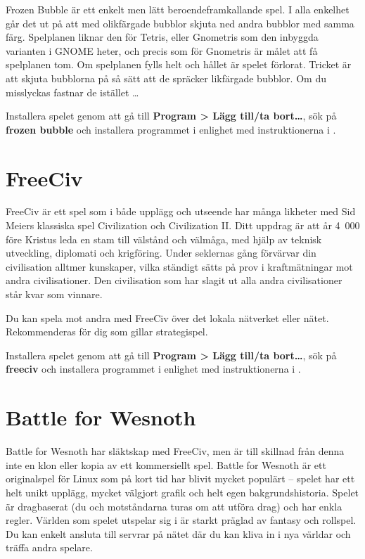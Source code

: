 \documentclass[a4paper,final]{memoir} %
\begin{document}
Frozen Bubble är ett enkelt men lätt beroendeframkallande spel. I alla enkelhet går det ut på att med olikfärgade bubblor skjuta ned andra bubblor med samma färg. Spelplanen liknar den för Tetris, eller Gnometris som den inbyggda varianten i GNOME heter, och precis som för Gnometris är målet att få spelplanen tom. Om spelplanen fylls helt och hållet är spelet förlorat. Tricket är att skjuta bubblorna på så sätt att de spräcker likfärgade bubblor. Om du misslyckas fastnar de istället \ldots{}


Installera spelet genom att gå till \textbf{Program \textgreater{} Lägg till/ta bort\ldots{}}, sök på \textbf{frozen bubble} och installera programmet i enlighet med instruktionerna i .

\section{FreeCiv}

FreeCiv är ett spel som i både upplägg och utseende har många likheter med Sid Meiers klassiska spel Civilization och Civilization II. Ditt uppdrag är att år 4~000 före Kristus leda en stam till välstånd och välmåga, med hjälp av teknisk utveckling, diplomati och krigföring. Under seklernas gång förvärvar din civilisation alltmer kunskaper, vilka ständigt sätts på prov i kraftmätningar mot andra civilisationer. Den civilisation som har slagit ut alla andra civilisationer står kvar som vinnare. 

Du kan spela mot andra med FreeCiv över det lokala nätverket eller nätet. Rekommenderas för dig som gillar strategispel.


Installera spelet genom att gå till \textbf{Program \textgreater{} Lägg till/ta bort\ldots{}}, sök på \textbf{freeciv} och installera programmet i enlighet med instruktionerna i .

\section{Battle for Wesnoth}

Battle for Wesnoth har släktskap med FreeCiv, men är till skillnad från denna inte en klon eller kopia av ett kommersiellt spel. Battle for Wesnoth är ett originalspel för Linux som på kort tid har blivit mycket populärt -- spelet har ett helt unikt upplägg, mycket välgjort grafik och helt egen bakgrundshistoria. Spelet är dragbaserat (du och motståndarna turas om att utföra drag) och har enkla regler. Världen som spelet utspelar sig i är starkt präglad av fantasy och rollspel. Du kan enkelt ansluta till servrar på nätet där du kan kliva in i nya världar och träffa andra spelare.
\end{document}
